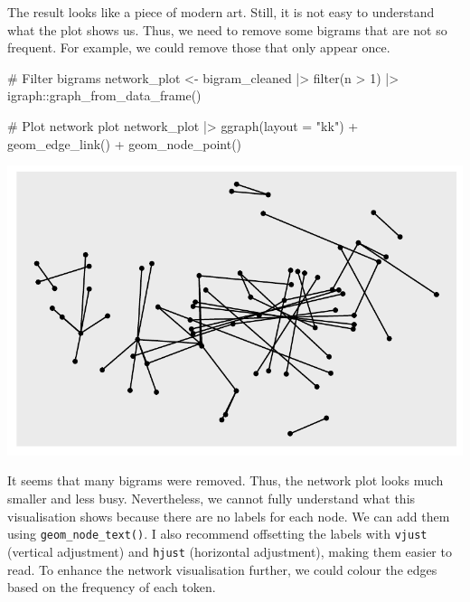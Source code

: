 \documentclass[
  letterpaper,
]{krantz}
\makeatletter
\newenvironment{Shaded}{\begin{snugshade}}{\end{snugshade}}
\newcommand{\AttributeTok}[1]{\textcolor[rgb]{0.40,0.45,0.13}{#1}}
\newcommand{\CommentTok}[1]{\textcolor[rgb]{0.37,0.37,0.37}{#1}}
\newcommand{\DecValTok}[1]{\textcolor[rgb]{0.68,0.00,0.00}{#1}}
\newcommand{\FunctionTok}[1]{\textcolor[rgb]{0.28,0.35,0.67}{#1}}
\newcommand{\NormalTok}[1]{\textcolor[rgb]{0.00,0.23,0.31}{#1}}
\newcommand{\OtherTok}[1]{\textcolor[rgb]{0.00,0.23,0.31}{#1}}
\newcommand{\SpecialCharTok}[1]{\textcolor[rgb]{0.37,0.37,0.37}{#1}}
\newcommand{\StringTok}[1]{\textcolor[rgb]{0.13,0.47,0.30}{#1}}
\newenvironment{kframe}{%
\medskip{}
\setlength{\fboxsep}{.8em}
 \def\at@end@of@kframe{}%
 \ifinner\ifhmode%
  \def\at@end@of@kframe{\end{minipage}}%
  \begin{minipage}{\columnwidth}%
 \fi\fi%
 \def\FrameCommand##1{\hskip\@totalleftmargin \hskip-\fboxsep
 \colorbox{shadecolor}{##1}\hskip-\fboxsep
     \hskip-\linewidth \hskip-\@totalleftmargin \hskip\columnwidth}%
 \MakeFramed {\advance\hsize-\width
   \@totalleftmargin\z@ \linewidth\hsize
   \@setminipage}}%
 {\par\unskip\endMakeFramed%
 \at@end@of@kframe}
\renewenvironment{Shaded}{\begin{kframe}}{\end{kframe}}
\makeatother
\begin{document}
The result looks like a piece of modern art. Still, it is not easy to
understand what the plot shows us. Thus, we need to remove some bigrams
that are not so frequent. For example, we could remove those that only
appear once.

\begin{Shaded}
\begin{Highlighting}[]
\CommentTok{\# Filter bigrams}
\NormalTok{network\_plot }\OtherTok{\textless{}{-}}\NormalTok{ bigram\_cleaned }\SpecialCharTok{|\textgreater{}}
  \FunctionTok{filter}\NormalTok{(n }\SpecialCharTok{\textgreater{}} \DecValTok{1}\NormalTok{) }\SpecialCharTok{|\textgreater{}}
\NormalTok{  igraph}\SpecialCharTok{::}\FunctionTok{graph\_from\_data\_frame}\NormalTok{()}

\CommentTok{\# Plot network plot}
\NormalTok{network\_plot }\SpecialCharTok{|\textgreater{}}
  \FunctionTok{ggraph}\NormalTok{(}\AttributeTok{layout =} \StringTok{"kk"}\NormalTok{) }\SpecialCharTok{+}
  \FunctionTok{geom\_edge\_link}\NormalTok{() }\SpecialCharTok{+}
  \FunctionTok{geom\_node\_point}\NormalTok{()}
\end{Highlighting}
\end{Shaded}

\includegraphics{14_mixed_methods_files/figure-pdf/ngrams-network-plot-step-two-1.pdf}

It seems that many bigrams were removed. Thus, the network plot looks
much smaller and less busy. Nevertheless, we cannot fully understand
what this visualisation shows because there are no labels for each node.
We can add them using \texttt{geom\_node\_text()}. I also recommend
offsetting the labels with \texttt{vjust} (vertical adjustment) and
\texttt{hjust} (horizontal adjustment), making them easier to read. To
enhance the network visualisation further, we could colour the edges
based on the frequency of each token.
\end{document}
